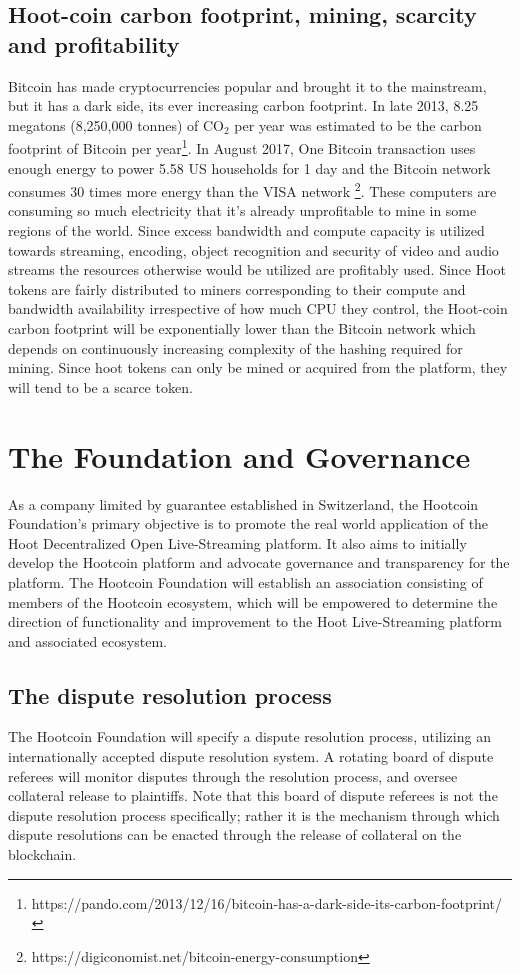 \documentclass{article}
\begin{document}
\subsection{Hoot-coin carbon footprint, mining, scarcity and profitability}
Bitcoin has made cryptocurrencies popular and brought it to the mainstream, but it has a dark side, its ever increasing carbon footprint. In late 2013, 8.25 megatons (8,250,000 tonnes) of CO$_2$ per year was estimated to be the carbon footprint of Bitcoin per year\footnote{https://pando.com/2013/12/16/bitcoin-has-a-dark-side-its-carbon-footprint/}. In August 2017, One Bitcoin transaction uses enough energy to power 5.58 US households for 1 day and the Bitcoin network consumes 30 times more energy than the VISA network \footnote{https://digiconomist.net/bitcoin-energy-consumption}. These computers are consuming so much electricity that it’s already unprofitable to mine in some regions of the world. Since excess bandwidth and compute capacity is utilized towards streaming, encoding, object recognition and security of video and audio streams the resources otherwise would be utilized are profitably used. Since Hoot tokens are fairly distributed to miners corresponding to their compute and bandwidth availability irrespective of how much CPU they control, the Hoot-coin carbon footprint will be exponentially lower than the Bitcoin network which depends on continuously increasing complexity of the hashing required for mining. Since hoot tokens can only be mined or acquired from the platform, they will tend to be a scarce token.

\section{The Foundation and Governance} %
\label{sec:the_foundation_and_governance}
As a company limited by guarantee established in Switzerland, the Hootcoin Foundation's primary objective is to promote the real world application of the Hoot Decentralized Open Live-Streaming platform. It also aims to initially develop the Hootcoin platform and advocate governance and transparency for the platform. The Hootcoin Foundation will establish an association consisting of members of the Hootcoin ecosystem, which will be empowered to determine the direction of functionality and improvement to the Hoot Live-Streaming platform and associated ecosystem.

\subsection{The dispute resolution process} %
\label{sub:the_dispute_resolution_process}
The Hootcoin Foundation will specify a dispute resolution process, utilizing an internationally accepted dispute resolution system. A rotating board of dispute referees will monitor disputes through the resolution process, and oversee collateral release to plaintiffs. Note that this board of dispute referees is not the dispute resolution process specifically; rather it is the mechanism through which dispute resolutions can be enacted through the release of collateral on the blockchain.
\end{document}

